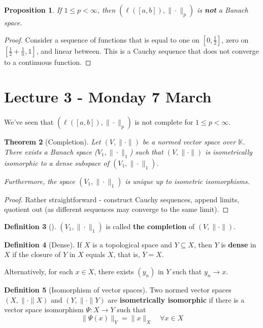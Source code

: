 \documentclass[10pt, oneside, reqno]{amsart}
\theoremstyle{plain}%
\newtheorem{thm}{Theorem}[section]
\newtheorem{prop}[thm]{Proposition}
\theoremstyle{definition}
\newtheorem{defn}[thm]{Definition}
\theoremstyle{remark}
\newcommand{\K}{\mathbb{K}}
\begin{document}
\begin{prop}
    If $1 \leq p < \infty$, then $(\ell([a,b]), \| \cdot \|_p)$ is \textbf{not} a Banach space.
\end{prop}
\begin{proof}
    Consider a sequence of functions that is equal to one on $[0, \frac{1}{2}]$, zero on $[\frac{1}{2}+ \frac{1}{n}, 1]$, and linear between.  This is a Cauchy sequence that does not converge to a continuous function. 
\end{proof}

\section{Lecture 3 - Monday 7 March} %
\label{sec:lecture_3_monday_7_march}
We've seen that $(\ell([a,b]), \| \cdot \|_p)$ is not complete for $1 \leq p < \infty$.  

\begin{thm}[Completion] Let $(V, \| \cdot \| )$ be a normed vector space over $\K$.  There exists a Banach space ($V_1, \| \cdot \|_1$) such that $( V, \| \cdot \|)$ is isometrically isomorphic to a dense subspace of $(V_1, \| \cdot \|_1)$.  
    
    Furthermore, the space $( V_1, \| \cdot \|_1)$ is unique up to isometric isomorphisms.  
\end{thm}

\begin{proof}
    Rather straightforward - construct Cauchy sequences, append limits, quotient out (as different sequences may converge to the same limit).
\end{proof}

\begin{defn}[] $(V_1, \| \cdot \|_1)$ is called \textbf{the completion} of $(V, \| \cdot \|)$. 
\end{defn}

\begin{defn}[Dense]
    If $X$ is a topological space and $Y \subseteq X$, then $Y$ is \textbf{dense} in $X$ if the closure of $Y$ in $X$ equals $X$, that is, $\overline{Y} = X$.

Alternatively, for each $x \in X$, there exists $(y_n)$ in $Y$ such that $y_n \rightarrow x$.
\end{defn}

\begin{defn}[Isomorphism of vector spaces]
    Two normed vector spaces $(X, \| \cdot \|X)$ and $(Y, \| \cdot \|Y)$ are \textbf{isometrically isomorphic} if there is a vector space isomorphism $\Psi: X \rightarrow Y$ such that \[
        \| \Psi(x) \|_Y = \| x \|_X \quad \forall x \in X
    \]
\end{defn}
\end{document}
